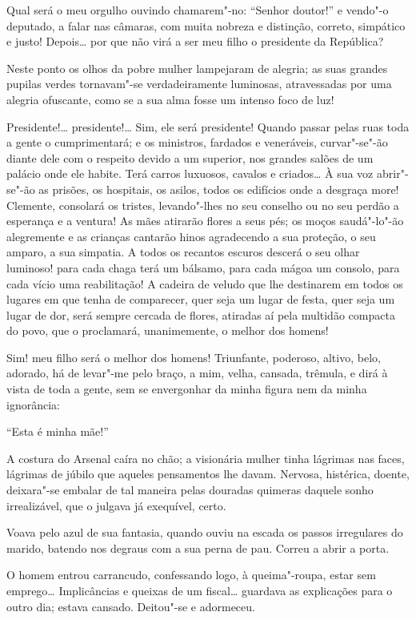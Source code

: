 Qual será o meu orgulho ouvindo chamarem"-no: ``Senhor doutor!'' e
vendo"-o deputado, a falar nas câmaras, com muita nobreza e distinção,
correto, simpático e justo! Depois\ldots{} por que não virá a ser meu filho o
presidente da República?

Neste ponto os olhos da pobre mulher lampejaram de alegria; as suas
grandes pupilas verdes tornavam"-se verdadeiramente luminosas,
atravessadas por uma alegria ofuscante, como se a sua alma fosse um
intenso foco de luz!

Presidente!\ldots{} presidente!\ldots{} Sim, ele será presidente! Quando passar
pelas ruas toda a gente o cumprimentará; e os ministros, fardados e
veneráveis, curvar"-se"-ão diante dele com o respeito devido a um
superior, nos grandes salões de um palácio onde ele habite. Terá carros
luxuosos, cavalos e criados\ldots{} À sua voz abrir"-se"-ão as prisões, os
hospitais, os asilos, todos os edifícios onde a desgraça more! Clemente,
consolará os tristes, levando"-lhes no seu conselho ou no seu perdão a
esperança e a ventura! As mães atirarão flores a seus pés; os moços
saudá"-lo"-ão alegremente e as crianças cantarão hinos agradecendo a sua
proteção, o seu amparo, a sua simpatia. A todos os recantos escuros
descerá o seu olhar luminoso! para cada chaga terá um bálsamo, para cada
mágoa um consolo, para cada vício uma reabilitação! A cadeira de veludo
que lhe destinarem em todos os lugares em que tenha de comparecer, quer
seja um lugar de festa, quer seja um lugar de dor, será sempre cercada
de flores, atiradas aí pela multidão compacta do povo, que o proclamará,
unanimemente, o melhor dos homens!

Sim! meu filho será o melhor dos homens! Triunfante, poderoso, altivo,
belo, adorado, há de levar"-me pelo braço, a mim, velha, cansada,
trêmula, e dirá à vista de toda a gente, sem se envergonhar da minha
figura nem da minha ignorância:

``Esta é minha mãe!''

A costura do Arsenal caíra no chão; a visionária mulher tinha lágrimas
nas faces, lágrimas de júbilo que aqueles pensamentos lhe davam.
Nervosa, histérica, doente, deixara"-se embalar de tal maneira pelas
douradas quimeras daquele sonho irrealizável, que o julgava já
exequível, certo.

Voava pelo azul de sua fantasia, quando ouviu na escada os passos
irregulares do marido, batendo nos degraus com a sua perna de pau.
Correu a abrir a porta.

O homem entrou carrancudo, confessando logo, à queima"-roupa, estar sem
emprego\ldots{} Implicâncias e queixas de um fiscal\ldots{} guardava as
explicações para o outro dia; estava cansado. Deitou"-se e adormeceu.

